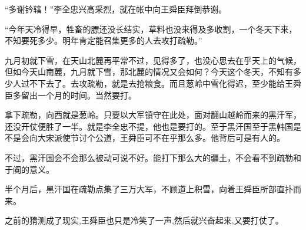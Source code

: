 “多谢钤辖！”李全忠兴高采烈，就在帐中向王舜臣拜倒恭谢。

“今年天冷得早，牲畜的膘还没长结实，草料也没来得及多收割，一个冬天下来，不知要死多少。明年肯定能召集更多的人去攻打疏勒。”

九月初就下雪，在天山北麓再平常不过，见得多了，也没心思去在乎天上的气候，但如今天山南麓，九月就下雪，那北麓的情况又会如何？今天这个冬天，不知有多少人过不下去了。去攻疏勒，就是去抢粮食。而且葱岭中雪化得迟，至少能给王舜臣多留出一个月的时间。当然要打。

拿下疏勒，向西就是葱岭。只要以大军镇守在此处，面对翻山越岭而来的黑汗军，还没开仗便胜了一半。就是李全忠不提，他也是要打的。至于黑汗国至于黑韩国是不是会向大宋派使节讨个公道，王舜臣可不在乎那么多。他背后可是有人的。

不过，黑汗国会不会那么被动可说不好。能打下那么大的疆土，不会看不到疏勒和于阗的意义。

半个月后，黑汗国在疏勒点集了三万大军，不顾道上积雪，向着王舜臣所部直扑而来。

之前的猜测成了现实,王舜臣也只是冷笑了一声,然后就兴奋起来,又要打仗了。
